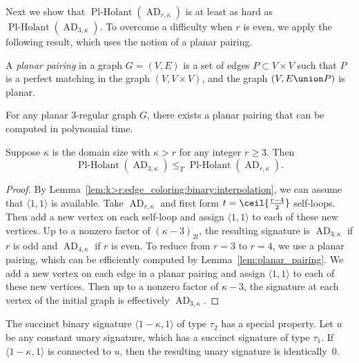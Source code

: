 \documentclass[11pt]{article}
\newcommand{\PlHolant}{\operatorname{Pl-Holant}}
\newcommand{\AD}{\operatorname{AD}}
\begin{document}
Next we show that $\PlHolant(\AD_{r,\kappa})$ is at least as hard as $\PlHolant(\AD_{3,\kappa})$.
To overcome a difficulty when $r$ is even,
we apply the following result,
which uses the notion of a planar pairing.

\begin{definition}
 A \emph{planar pairing} in a graph $G = (V, E)$ is a set of edges $P \subset V \times V$
 such that $P$ is a perfect matching in the graph $(V, V \times V)$,
 and the graph $(V, E \union P)$ is planar.
\end{definition}

\begin{lemma} \label{lem:planar_pairing}
 For any planar 3-regular graph $G$,
 there exists a planar pairing that can be computed in polynomial time.
\end{lemma}

\begin{lemma} \label{lem:reduction_to_AD3}
 Suppose $\kappa$ is the domain size with $\kappa > r$ for any integer $r \ge 3$.
 Then
 \[
  \PlHolant(\AD_{3,\kappa}) \le_T \PlHolant(\AD_{r,\kappa}).
 \]
\end{lemma}

\begin{proof}
 By Lemma~\ref{lem:k>r:edge_coloring:binary:interpolation},
 we can assume that $\langle 1,1 \rangle$ is available.
 Take $\AD_{r,\kappa}$ and first form $t = \ceil{\frac{r-4}{2}}$ self-loops.
 Then add a new vertex on each self-loop and assign $\langle 1,1 \rangle$ to each of these new vertices.
 Up to a nonzero factor of $(\kappa - 3)_{2t}$,
 the resulting signature is $\AD_{3,\kappa}$ if $r$ is odd and $\AD_{4,\kappa}$ if $r$ is even.
 To reduce from $r = 3$ to $r = 4$,
 we use a planar pairing,
 which can be efficiently computed by Lemma~\ref{lem:planar_pairing}.
 We add a new vertex on each edge in a planar pairing and assign $\langle 1,1 \rangle$ to each of these new vertices.
 Then up to a nonzero factor of $\kappa - 3$,
 the signature at each vertex of the initial graph is effectively $\AD_{3,\kappa}$.
\end{proof}

The succinct binary signature $\langle 1 - \kappa, 1 \rangle$ of type $\tau_2$ has a special property.
Let $u$ be any constant unary signature,
which has a succinct signature of type $\tau_1$.
If $\langle 1 - \kappa, 1 \rangle$ is connected to $u$,
then the resulting unary signature is identically~$0$.
\end{document}
